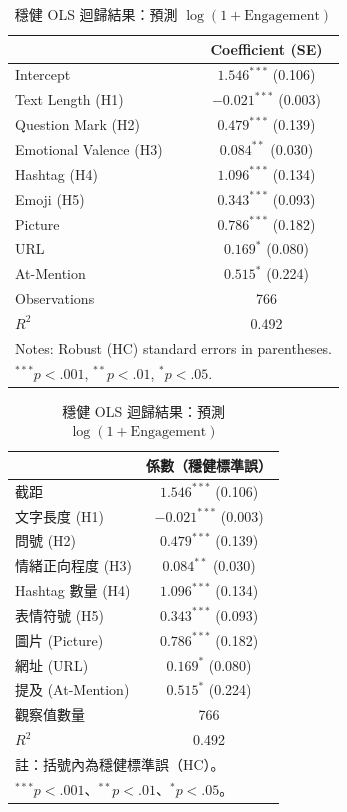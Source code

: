 \documentclass[12pt,a4paper,fontset=none]{ctexart}
\begin{document}
\begin{table}[htbp]
\centering
\caption{Robust OLS Regression Results predicting Log(Engagement)}
\label{tab:results}
\begin{tabular}{l c}
\toprule
 & \textbf{Coefficient (SE)} \\
\midrule
Intercept & $1.546^{***}$ (0.106) \\
Text Length (H1) & $-0.021^{***}$ (0.003) \\
Question Mark (H2) & $0.479^{***}$ (0.139) \\
Emotional Valence (H3) & $0.084^{**}$ (0.030) \\
Hashtag (H4) & $1.096^{***}$ (0.134) \\
Emoji (H5) & $0.343^{***}$ (0.093) \\
\midrule
Picture & $0.786^{***}$ (0.182) \\
URL & $0.169^{*}$ (0.080) \\
At-Mention & $0.515^{*}$ (0.224) \\
\midrule
Observations & 766 \\
$R^2$ & 0.492 \\
\bottomrule
\multicolumn{2}{l}{\small Notes: Robust (HC) standard errors in parentheses.}\\
\multicolumn{2}{l}{\small $^{***} p<.001$, $^{**} p<.01$, $^* p<.05$.}
\end{tabular}

\vspace{2em}

\caption{穩健 OLS 迴歸結果：預測 $\log(1+\text{Engagement})$}
\label{tab:results_tw}
\begin{tabular}{l c}
\toprule
 & \textbf{係數（穩健標準誤）} \\
\midrule
截距 & $1.546^{***}$ (0.106) \\
文字長度 (H1) & $-0.021^{***}$ (0.003) \\
問號 (H2) & $0.479^{***}$ (0.139) \\
情緒正向程度 (H3) & $0.084^{**}$ (0.030) \\
Hashtag 數量 (H4) & $1.096^{***}$ (0.134) \\
表情符號 (H5) & $0.343^{***}$ (0.093) \\
\midrule
圖片 (Picture) & $0.786^{***}$ (0.182) \\
網址 (URL) & $0.169^{*}$ (0.080) \\
提及 (At-Mention) & $0.515^{*}$ (0.224) \\
\midrule
觀察值數量 & 766 \\
$R^2$ & 0.492 \\
\bottomrule
\multicolumn{2}{l}{\small 註：括號內為穩健標準誤（HC）。}\\
\multicolumn{2}{l}{\small $^{***} p<.001$、$^{**} p<.01$、$^* p<.05$。}
\end{tabular}
\end{table}
\end{document}
